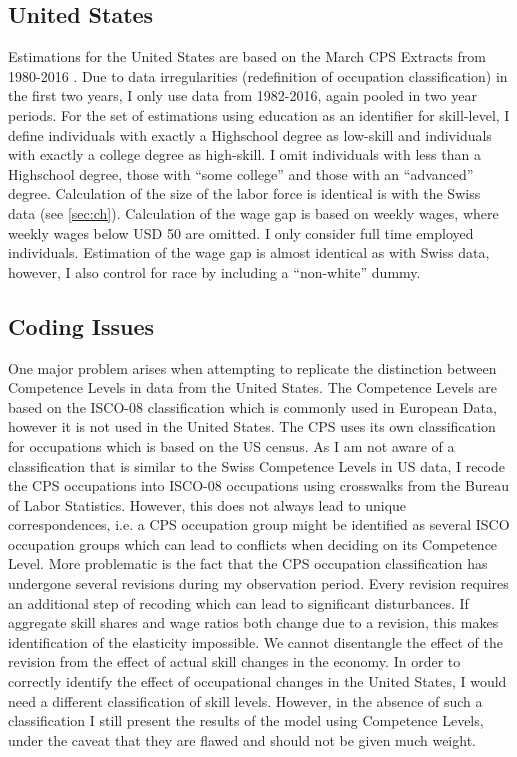\documentclass[]{article}
\begin{document}
\subsection{United States}
\label{data_us}
Estimations for the United States are based on the March CPS Extracts
from 1980-2016 \citep{CenterforEconomicandPolicyResearch.2016}. Due to
data irregularities (redefinition of occupation classification) in the
first two years, I only use data from 1982-2016, again pooled in two
year periods. For the set of estimations using education as an
identifier for skill-level, I define individuals with exactly a
Highschool degree as low-skill and individuals with exactly a college
degree as high-skill. I omit individuals with less than a Highschool
degree, those with ``some college'' and those with an ``advanced''
degree. Calculation of the size of the labor force is identical is
with the Swiss data (see \ref{sec:ch}). Calculation of the wage gap is
based on weekly wages, where weekly wages below USD 50 are omitted. I
only consider full time employed individuals. Estimation of the wage
gap is almost identical as with Swiss data, however, I also control
for race by including a ``non-white'' dummy.
\subsection{Coding Issues}
\label{issues}
One major problem arises when attempting to replicate the distinction
between Competence Levels in data from the United States. The
Competence Levels are based on the ISCO-08 classification which is
commonly used in European Data, however it is not used in the United
States. The CPS uses its own classification for occupations which is
based on the US census. As I am not aware of a classification that is
similar to the Swiss Competence Levels in US data, I recode the CPS
occupations into ISCO-08 occupations using crosswalks from the Bureau
of Labor Statistics. However, this does not always lead to unique
correspondences, i.e. a CPS occupation group might be identified as
several ISCO occupation groups which can lead to conflicts when
deciding on its Competence Level. More problematic is the fact that
the CPS occupation classification has undergone several revisions
during my observation period. Every revision requires an additional
step of recoding which can lead to significant disturbances. If
aggregate skill shares and wage ratios both change due to a revision,
this makes identification of the elasticity impossible. We cannot
disentangle the effect of the revision from the effect of actual skill
changes in the economy. In order to correctly identify the effect of
occupational changes in the United States, I would need a different
classification of skill levels. However, in the absence of such a
classification I still present the results of the model using
Competence Levels, under the caveat that they are flawed and should
not be given much weight.
\end{document}
